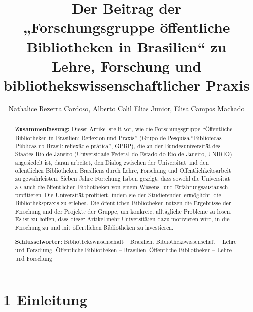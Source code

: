 \documentclass[a4paper,
fontsize=11pt,
oneside,
numbers=noperiodatend,
parskip=half-,
bibliography=totoc,
final
]{scrartcl}
\title{\LARGE{Der Beitrag der „Forschungsgruppe öffentliche Bibliotheken in Brasilien“ zu Lehre, Forschung und bibliothekswissenschaftlicher Praxis}}%
\author{Nathalice Bezerra Cardoso, Alberto Calil Elias Junior, Elisa Campos Machado} %
\date{}
\begin{document}
\maketitle
\thispagestyle{fancyplain} 

\begin{abstract}
\noindent
\textbf{Zusammenfassung:} Dieser Artikel stellt vor, wie die
Forschungsgruppe ``Öffentliche Bibliotheken in Brasilien: Reflexion und
Praxis'' (Grupo de Pesquisa ``Bibliotecas Públicas no Brasil: reflexão e
prática'', GPBP), die an der Bundesuniversität des Staates Rio de
Janeiro (Universidade Federal do Estado do Rio de Janeiro, UNIRIO)
angesiedelt ist, daran arbeitet, den Dialog zwischen der Universität und
den öffentlichen Bibliotheken Brasiliens durch Lehre, Forschung und
Öffentlichkeitsarbeit zu gewährleisten. Sieben Jahre Forschung haben
gezeigt, dass sowohl die Universität als auch die öffentlichen
Bibliotheken von einem Wissens- und Erfahrungsaustausch profitieren. Die
Universität profitiert, indem sie den Studierenden ermöglicht, die
Bibliothekspraxis zu erleben. Die öffentlichen Bibliotheken nutzen die
Ergebnisse der Forschung und der Projekte der Gruppe, um konkrete,
alltägliche Probleme zu lösen. Es ist zu hoffen, dass dieser Artikel
mehr Universitäten dazu motivieren wird, in die Forschung zu und mit
öffentlichen Bibliotheken zu investieren.

\textbf{Schlüsselwörter:} Bibliothekswissenschaft -- Brasilien.
Bibliothekswissenschaft -- Lehre und Forschung. Öffentliche Bibliotheken
-- Brasilien. Öffentliche Bibliotheken -- Lehre und Forschung
\end{abstract}

\hypertarget{einleitung}{%
\section{1 Einleitung}\label{einleitung}}
\end{document}
